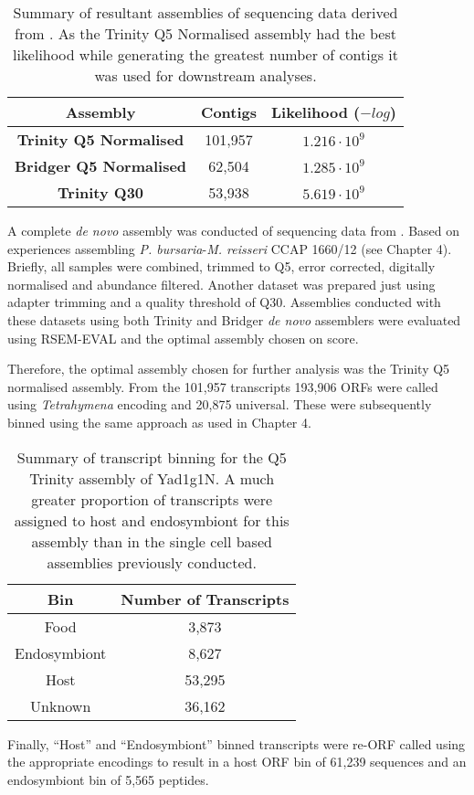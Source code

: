 \begin{table}
    \centering
    \begin{tabular}{|c|c|c|}
        \hline
        \textbf{Assembly} & \textbf{Contigs} & \textbf{Likelihood (\(-log\))}\\
        \hline
        \textbf{Trinity Q5 Normalised}  & 101,957 & \(1.216\cdot10^9\)\\
        \textbf{Bridger Q5 Normalised} & 62,504 & \(1.285\cdot10^9\)\\
        \textbf{Trinity Q30} & 53,938  & \(5.619\cdot10^{9} \) \\
        \hline
    \end{tabular}
    \caption[Summary of Yad1g1N transcriptome assemblies]{Summary of resultant 
    assemblies of sequencing data derived from \citep{Kodama2014c}.  As the
Trinity Q5 Normalised assembly had the best likelihood while generating
the greatest number of contigs it was used for downstream analyses.}
    \label{tab:kodama_assembly}
\end{table}

A complete \textit{de novo} assembly was conducted of sequencing data
from \citep{Kodama2014c}.  Based on experiences assembling
\textit{P. bursaria}-\textit{M. reisseri} CCAP 1660/12 (see Chapter 4).
Briefly, all samples were combined, trimmed to Q5, 
error corrected, digitally normalised and abundance filtered.  Another dataset
was prepared just using adapter trimming and a quality threshold of Q30.
Assemblies conducted with these datasets using both Trinity and Bridger
\textit{de novo} assemblers were evaluated using RSEM-EVAL and the optimal
assembly chosen on score. 

Therefore, the optimal assembly chosen for further analysis was the Trinity
Q5 normalised assembly.
From the 101,957 transcripts 193,906 ORFs were called using \textit{Tetrahymena}
encoding and 20,875 universal.
These were subsequently binned using the same approach as used in 
Chapter 4.

\begin{table}
    \centering
    \begin{tabular}{|c|c|}
        \hline
        \textbf{Bin} & \textbf{Number of Transcripts} \\
        \hline
        Food & 3,873 \\
        Endosymbiont & 8,627 \\
        Host & 53,295 \\
        Unknown & 36,162 \\
        \hline
    \end{tabular}
    \caption[Yad1g1N transcript binning summary]{Summary of transcript
        binning for the Q5 Trinity assembly of Yad1g1N.  
        A much greater proportion of transcripts were assigned
        to host and endosymbiont for this assembly than in the single cell
    based assemblies previously conducted.}
\end{table}
Finally, ``Host'' and ``Endosymbiont'' binned transcripts 
were re-ORF called using the appropriate encodings to result in a 
host ORF bin of 61,239 sequences
and an endosymbiont bin of 5,565 peptides. 


